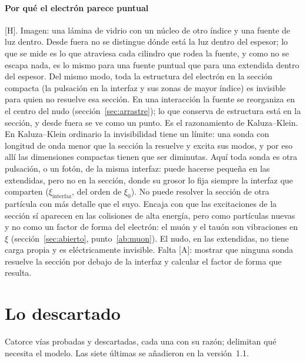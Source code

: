 \documentclass[11pt,a4paper]{article}
\newcommand{\st}[1]{\textup{[#1]}}
\newcommand{\apartado}[1]{\paragraph{#1}}
\begin{document}
\apartado{Por qué el electrón parece puntual} \st{H}. Imagen: una lámina de vidrio con un núcleo de otro índice y una fuente de luz dentro. Desde fuera no se distingue dónde está la luz dentro del espesor; lo que se mide es lo que atraviesa cada cilindro que rodea la fuente, y como no se escapa nada, es lo mismo para una fuente puntual que para una extendida dentro del espesor. Del mismo modo, toda la estructura del electrón en la sección compacta (la pulsación en la interfaz y sus zonas de mayor índice) es invisible para quien no resuelve esa sección. En una interacción la fuente se reorganiza en el centro del nudo (sección~\ref{sec:arrastre}); lo que conserva de estructura está en la sección, y desde fuera se ve como un punto. Es el razonamiento de Kaluza--Klein. En Kaluza--Klein ordinario la invisibilidad tiene un límite: una sonda con longitud de onda menor que la sección la resuelve y excita sus modos, y por eso allí las dimensiones compactas tienen que ser diminutas. Aquí toda sonda es otra pulsación, o un fotón, de la misma interfaz: puede hacerse pequeña en las extendidas, pero no en la sección, donde su grosor lo fija siempre la interfaz que comparten ($\xi_{\mathrm{interfaz}}$, del orden de $\xi_0$). No puede resolver la sección de otra partícula con más detalle que el suyo. Encaja con que las excitaciones de la sección sí aparecen en las colisiones de alta energía, pero como partículas nuevas y no como un factor de forma del electrón: el muón y el tauón son vibraciones en $\xi$ (sección~\ref{sec:abierto}, punto~\ref{ab:muon}). El nudo, en las extendidas, no tiene carga propia y es eléctricamente invisible. Falta \st{A}: mostrar que ninguna sonda resuelve la sección por debajo de la interfaz y calcular el factor de forma que resulta.

\section{Lo descartado}\label{sec:descartado}

Catorce vías probadas y descartadas, cada una con su razón; delimitan qué necesita el modelo. Las siete últimas se añadieron en la versión~1.1.
\end{document}
